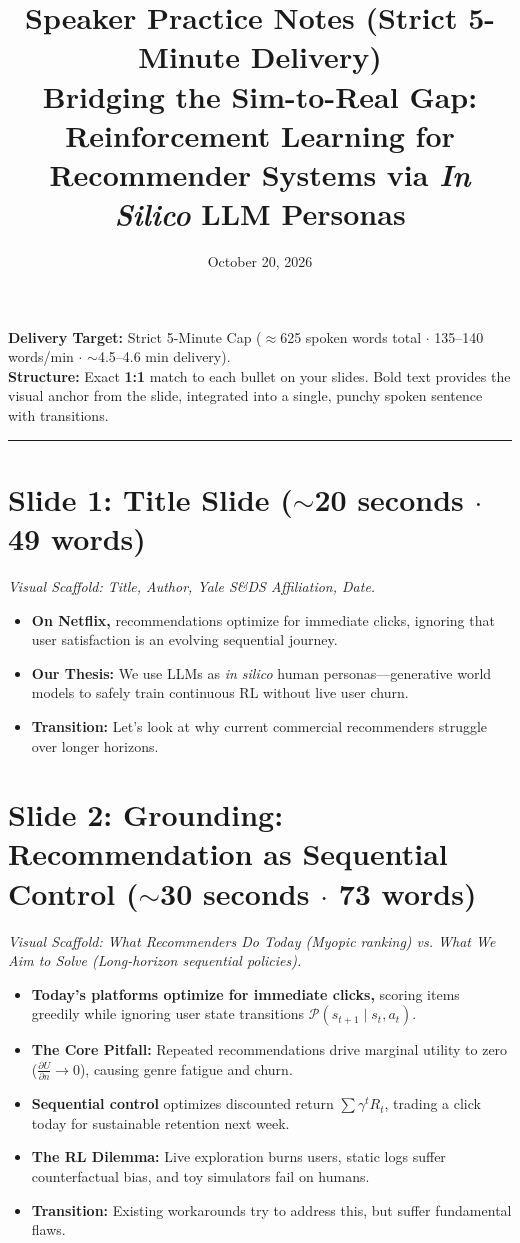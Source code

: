 \documentclass[]{0_aga-homework}
\title{\textbf{Speaker Practice Notes (Strict 5-Minute Delivery)}\\
\large \textbf{Bridging the Sim-to-Real Gap:} Reinforcement Learning for Recommender Systems via \textit{In Silico} LLM Personas}
\date{October 20, 2026}
\begin{document}
\noindent\textbf{Delivery Target:} Strict 5-Minute Cap ($\approx$625 spoken words total $\cdot$ 135--140 words/min $\cdot$ $\sim$4.5--4.6 min delivery). \\
\textbf{Structure:} Exact \textbf{1:1} match to each bullet on your slides. Bold text provides the visual anchor from the slide, integrated into a single, punchy spoken sentence with transitions.

\bigskip
\hrule
\bigskip

\section*{Slide 1: Title Slide ($\sim$20 seconds $\cdot$ 49 words)}
\noindent\textit{Visual Scaffold: Title, Author, Yale S\&DS Affiliation, Date.}

\begin{itemize}
  \item \textbf{On Netflix,} recommendations optimize for immediate clicks, ignoring that user satisfaction is an evolving sequential journey.
  \item \textbf{Our Thesis:} We use LLMs as \textit{in silico} human personas—generative world models to safely train continuous RL without live user churn.
  \item \textbf{Transition:} Let's look at why current commercial recommenders struggle over longer horizons.
\end{itemize}

\section*{Slide 2: Grounding: Recommendation as Sequential Control ($\sim$30 seconds $\cdot$ 73 words)}
\noindent\textit{Visual Scaffold: What Recommenders Do Today (Myopic ranking) vs. What We Aim to Solve (Long-horizon sequential policies).}

\begin{itemize}
  \item \textbf{Today's platforms optimize for immediate clicks,} scoring items greedily while ignoring user state transitions $\mathcal{P}(s_{t+1} \mid s_t, a_t)$.
  \item \textbf{The Core Pitfall:} Repeated recommendations drive marginal utility to zero ($\frac{\partial U}{\partial n} \to 0$), causing genre fatigue and churn.
  \item \textbf{Sequential control} optimizes discounted return $\sum \gamma^t R_t$, trading a click today for sustainable retention next week.
  \item \textbf{The RL Dilemma:} Live exploration burns users, static logs suffer counterfactual bias, and toy simulators fail on humans.
  \item \textbf{Transition:} Existing workarounds try to address this, but suffer fundamental flaws.
\end{itemize}
\end{document}
